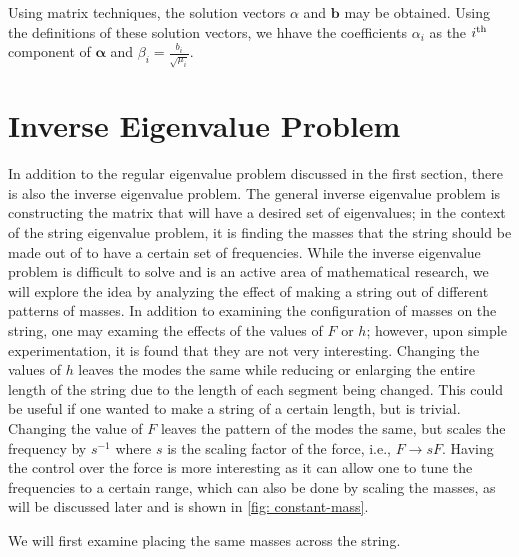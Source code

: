 \documentclass[10pt,a4paper]{article}
\renewcommand{\vec}[1]{\boldsymbol{#1}}
\begin{document}
\begin{multicols*}{2}
Using matrix techniques, the solution vectors $\alpha$ and $\vec{b}$ may be obtained. Using the definitions of these solution vectors, we hhave the coefficients $\alpha_i$ as the $i^{\rm{th}}$ component of $\vec{\alpha}$ and $\beta_i = \frac{b_i}{\sqrt{\mu_i}}$.


\section*{Inverse Eigenvalue Problem}

In addition to the regular eigenvalue problem discussed in the first section, there is also the inverse eigenvalue problem. The general inverse eigenvalue problem is constructing the matrix that will have a desired set of eigenvalues; in the context of the string eigenvalue problem, it is finding the masses that the string should be made out of to have a certain set of frequencies. While the inverse eigenvalue problem is difficult to solve and is an active area of mathematical research, we will explore the idea by analyzing the effect of making a string out of different patterns of masses. In addition to examining the configuration of masses on the string, one may examing the effects of the values of $F$ or $h$; however, upon simple experimentation, it is found that they are not very interesting. Changing the values of $h$ leaves the modes the same while reducing or enlarging the entire length of the string due to the length of each segment being changed. This could be useful if one wanted to make a string of a certain length, but is trivial. Changing the value of $F$ leaves the pattern of the modes the same, but scales the frequency by $s^{-1}$ where $s$ is the scaling factor of the force, i.e., $F \to sF$. Having the control over the force is more interesting as it can allow one to tune the frequencies to a certain range, which can also be done by scaling the masses, as will be discussed later and is shown in \cref{fig: constant-mass}.

\pagebreak
We will first examine placing the same masses across the string.


\end{multicols*}
\end{document}
